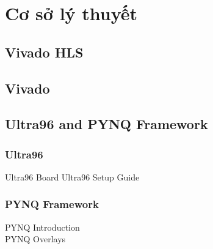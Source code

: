 \chapter{Cơ sở lý thuyết} \label{chap:theory}
    \section{Vivado HLS}
    \section{Vivado}
    \section{Ultra96 and PYNQ Framework}
        \subsection{Ultra96}
        Ultra96 Board
        Ultra96 Setup Guide
        \subsection{PYNQ Framework}
        PYNQ Introduction\\
        PYNQ Overlays\\